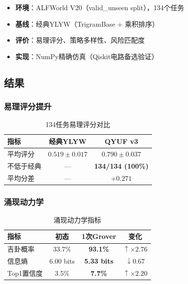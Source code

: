 \documentclass[twocolumn]{article}
\begin{document}
\begin{itemize}
  \item \textbf{环境}：ALFWorld V20（valid\_unseen split），134个任务
  \item \textbf{基线}：经典YLYW（TrigramBase + 乘积排序）
  \item \textbf{评价}：易理评分、策略多样性、风险匹配度
  \item \textbf{实现}：NumPy精确仿真（Qiskit电路备选验证）
\end{itemize}

\subsection{结果}

\subsubsection{易理评分提升}

\begin{table}[htbp]
\centering
\caption{134任务易理评分对比}
\label{tab:scores}
\begin{tabular}{lcc}
\toprule
\textbf{指标} & \textbf{经典YLYW} & \textbf{QYUF v3} \\
\midrule
平均评分 & $0.519\pm0.017$ & $\mathbf{0.790\pm0.037}$ \\
不低于经典 & --- & \textbf{134/134 (100\%)} \\
平均分差 & --- & $\mathbf{+0.271}$ \\
\bottomrule
\end{tabular}
\end{table}

\subsubsection{涌现动力学}

\begin{table}[htbp]
\centering
\caption{涌现动力学指标}
\label{tab:dyn}
\begin{tabular}{lccc}
\toprule
\textbf{指标} & \textbf{初态} & \textbf{1次Grover} & \textbf{变化} \\
\midrule
吉卦概率 & 33.7\% & \textbf{93.1\%} & $\uparrow\times2.76$ \\
信息熵 & 6.00 bits & \textbf{5.33 bits} & $\downarrow 0.67$ \\
Top1置信度 & 3.5\% & \textbf{7.7\%} & $\uparrow\times2.20$ \\
\bottomrule
\end{tabular}
\end{table}
\end{document}
